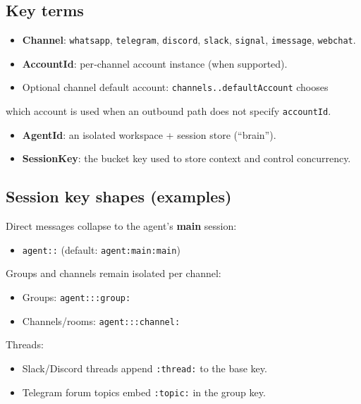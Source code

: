 \subsection{Key terms}


\begin{itemize}
  \item \textbf{Channel}: \texttt{whatsapp}, \texttt{telegram}, \texttt{discord}, \texttt{slack}, \texttt{signal}, \texttt{imessage}, \texttt{webchat}.
  \item \textbf{AccountId}: per‑channel account instance (when supported).
  \item Optional channel default account: \texttt{channels..defaultAccount} chooses
\end{itemize}

which account is used when an outbound path does not specify \texttt{accountId}.
\begin{itemize}
  \item \textbf{AgentId}: an isolated workspace + session store (“brain”).
  \item \textbf{SessionKey}: the bucket key used to store context and control concurrency.
\end{itemize}


\subsection{Session key shapes (examples)}


Direct messages collapse to the agent’s \textbf{main} session:

\begin{itemize}
  \item \texttt{agent::} (default: \texttt{agent:main:main})
\end{itemize}


Groups and channels remain isolated per channel:

\begin{itemize}
  \item Groups: \texttt{agent:::group:}
  \item Channels/rooms: \texttt{agent:::channel:}
\end{itemize}


Threads:

\begin{itemize}
  \item Slack/Discord threads append \texttt{:thread:} to the base key.
  \item Telegram forum topics embed \texttt{:topic:} in the group key.
\end{itemize}


